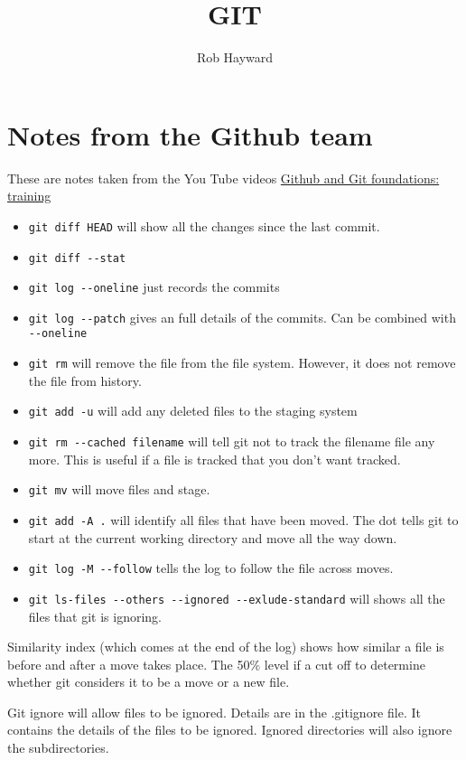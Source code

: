 \documentclass[11pt]{article} %
\title{GIT}
\author{Rob Hayward}
\begin{document}
\maketitle
\section{Notes from the Github team}
These are notes taken from the You Tube videos \href{https://www.youtube.com/watch?v=WxMFZncm12s&index=4&list=PLg7s6cbtAD15G8lNyoaYDuKZSKyJrgwB-}{Github and Git foundations: training}
\begin{itemize}
\item \lstinline{git diff HEAD} will show all the changes since the last commit. 
\item \lstinline{git diff --stat} 
\item \lstinline{git log --oneline} just records the commits
\item \lstinline{git log --patch} gives an full details of the commits. Can be combined with \lstinline{--oneline}
\item \lstinline{git rm} will remove the file from the file system.  However, it does not remove the file from history. 
\item \lstinline{git add -u} will add any deleted files to the staging system
\item \lstinline{git rm --cached filename} will tell git not to track the filename file any more.  This is useful if a file is tracked that you don't want tracked.  
\item \lstinline{git mv} will move files and stage.
\item  \lstinline{git add -A .} will identify all files that have been moved.  The dot tells git to start at the current working directory and move all the way down.
\item \lstinline{git log -M --follow} tells the log to follow the file across moves. 
\item \lstinline{git ls-files --others --ignored --exlude-standard} will shows all the files that git is ignoring. 
\end{itemize}
Similarity index (which comes at the end of the log) shows how similar a file is before and after a move takes place. The 50\% level if a cut off to determine whether git considers it to be a move or a new file. 

Git ignore will allow files to be ignored.  Details are in the .gitignore file.  It contains the details of the files to be ignored. Ignored directories will also ignore the subdirectories. 
\end{document}

